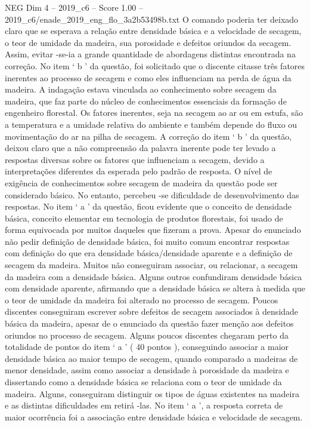 \begin{textsample}{NEG Dim 4 – 2019\_c6 – Score 1.00 – 2019\_c6/enade\_2019\_eng\_flo\_3a2b53498b.txt}
O comando poderia ter deixado claro que se esperava a relação entre densidade básica e a velocidade de secagem, o teor de umidade da madeira, sua porosidade e defeitos oriundos da secagem.
Assim, evitar -se-ia a grande quantidade de abordagens distintas encontrada na correção.
No item ‘ b ’ da questão, foi solicitado que o discente citasse três fatores inerentes ao processo de secagem e como eles influenciam na perda de água da madeira.
A indagação estava vinculada ao conhecimento sobre secagem da madeira, que faz parte do núcleo de conhecimentos essenciais da formação de engenheiro florestal.
Os fatores inerentes, seja na secagem ao ar ou em estufa, são a temperatura e a umidade relativa do ambiente e também depende do fluxo ou movimentação do ar na pilha de secagem.
A correção do item ‘ b ’ da questão, deixou claro que a não compreensão da palavra inerente pode ter levado a respostas diversas sobre os fatores que influenciam a secagem, devido a interpretações diferentes da esperada pelo padrão de resposta.
O nível de exigência de conhecimentos sobre secagem de madeira da questão pode ser considerado básico.
No entanto, percebeu -se dificuldade de desenvolvimento das respostas.
No item ‘ a ’ da questão, ficou evidente que o conceito de densidade básica, conceito elementar em tecnologia de produtos florestais, foi usado de forma equivocada por muitos daqueles que fizeram a prova.
Apesar do enunciado não pedir definição de densidade básica, foi muito comum encontrar respostas com definição do que era densidade básica/densidade aparente e a definição de secagem da madeira.
Muitos não conseguiram associar, ou relacionar, a secagem da madeira com a densidade básica.
Alguns outros confundiram densidade básica com densidade aparente, afirmando que a densidade básica se altera à medida que o teor de umidade da madeira foi alterado no processo de secagem.
Poucos discentes conseguiram escrever sobre defeitos de secagem associados à densidade básica da madeira, apesar de o enunciado da questão fazer menção aos defeitos oriundos no processo de secagem.
Alguns poucos discentes chegaram perto da totalidade de pontos do item ‘ a ’ ( 40 pontos ), conseguindo associar a maior densidade básica ao maior tempo de secagem, quando comparado a madeiras de menor densidade, assim como associar a densidade à porosidade da madeira e dissertando como a densidade básica se relaciona com o teor de umidade da madeira.
Alguns, conseguiram distinguir os tipos de águas existentes na madeira e as distintas dificuldades em retirá -las.
No item ‘ a ’, a resposta correta de maior ocorrência foi a associação entre densidade básica e velocidade de secagem.

\end{textsample}
